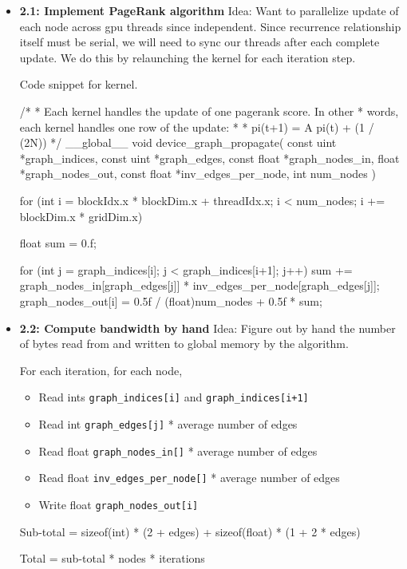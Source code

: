 \documentclass[12pt,letterpaper,twoside]{article}
\begin{document}
\begin{itemize}
    \item \textbf{2.1: Implement PageRank algorithm} Idea: Want to parallelize
    update of each node across gpu threads since independent. Since recurrence 
    relationship itself must be serial, we will need to sync our threads after 
    each complete update. We do this by relaunching the kernel for each 
    iteration step.

    Code snippet for kernel.
\begin{cpp}
/* 
* Each kernel handles the update of one pagerank score. In other
* words, each kernel handles one row of the update:
*
*      pi(t+1) = A pi(t) + (1 / (2N))
*/
__global__ void device_graph_propagate(
    const uint *graph_indices,
    const uint *graph_edges,
    const float *graph_nodes_in,
    float *graph_nodes_out,
    const float *inv_edges_per_node,
    int num_nodes
) {
    for (int i = blockIdx.x * blockDim.x + threadIdx.x;
        i < num_nodes;
    i += blockDim.x * gridDim.x) 
    {
        float sum = 0.f;    

        for (int j = graph_indices[i]; j < graph_indices[i+1]; j++) 
        {
        sum += graph_nodes_in[graph_edges[j]] * 
            inv_edges_per_node[graph_edges[j]];
        }
        graph_nodes_out[i] = 0.5f / (float)num_nodes + 0.5f * sum;
    }
}
\end{cpp}

    \item \textbf{2.2: Compute bandwidth by hand} Idea: Figure out by hand the number 
    of bytes read from and written to global memory by the algorithm.

    For each iteration, for each node,
    \begin{itemize}
        \item Read ints \texttt{graph\_indices[i]} and \texttt{graph\_indices[i+1]} 
        \item Read int \texttt{graph\_edges[j]} * average number of edges
        \item Read float \texttt{graph\_nodes\_in[]} * average number of edges
        \item Read float \texttt{inv\_edges\_per\_node[]} * average number of edges
        \item Write float \texttt{graph\_nodes\_out[i]}
    \end{itemize}
    Sub-total = sizeof(int) * (2 + edges) + sizeof(float) * (1 + 2 * edges)

    Total = sub-total * nodes * iterations


\end{itemize}
\end{document}
